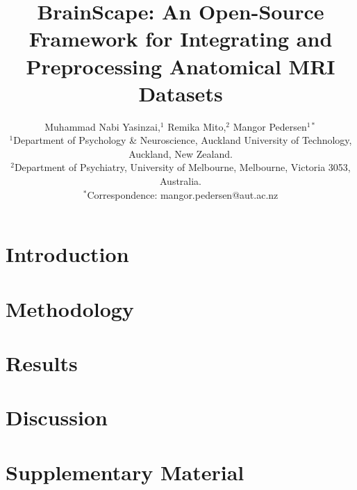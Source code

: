 \documentclass[]{imag-ms-template}
\title{BrainScape: An Open-Source Framework for Integrating and Preprocessing Anatomical MRI Datasets}
\author{Muhammad Nabi Yasinzai,$^{1}$ Remika Mito,$^{2}$ Mangor Pedersen$^{1\ast}$\\
{\small $^{1}$Department of Psychology \& Neuroscience, Auckland University of Technology,}\\
{\small Auckland, New Zealand.}\\
{\small $^{2}$Department of Psychiatry, University of Melbourne, Melbourne, Victoria 3053, Australia.}\\
{\small $^\ast$Correspondence: mangor.pedersen@aut.ac.nz}
}
\begin{document}
 


\maketitle 

\begin{abstract}
    
\end{abstract}


\FloatBarrier
\section{Introduction}


\FloatBarrier
\section{Methodology}


\FloatBarrier
\section{Results}


\FloatBarrier
\section{Discussion}


\FloatBarrier


\FloatBarrier
\section{Supplementary Material}



\printbibliography
\end{document}

